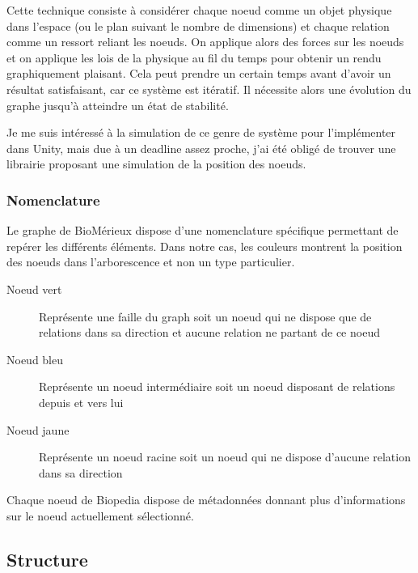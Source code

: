 Cette technique consiste à considérer chaque noeud comme un objet physique dans l'espace (ou le plan suivant le nombre de dimensions) et chaque relation comme un ressort reliant les noeuds.
On applique alors des forces sur les noeuds et on applique les lois de la physique au fil du temps pour obtenir un rendu graphiquement plaisant.
Cela peut prendre un certain temps avant d'avoir un résultat satisfaisant, car ce système est itératif.
Il nécessite alors une évolution du graphe jusqu'à atteindre un état de stabilité.

Je me suis intéressé à la simulation de ce genre de système pour l'implémenter dans Unity, mais due à un deadline assez proche, j'ai été obligé de trouver une librairie proposant une simulation de la position des noeuds.

\subsubsection{Nomenclature}
\label{biomerieuxBiopediaNomenclature}

Le graphe de BioMérieux dispose d'une nomenclature spécifique permettant de repérer les différents éléments.
Dans notre cas, les couleurs montrent la position des noeuds dans l'arborescence et non un type particulier.

\begin{description}
    \item[Noeud vert] Représente une faille du graph soit un noeud qui ne dispose que de relations dans sa direction et aucune relation ne partant de ce noeud
    \item[Noeud bleu] Représente un noeud intermédiaire soit un noeud disposant de relations depuis et vers lui
    \item[Noeud jaune] Représente un noeud racine soit un noeud qui ne dispose d'aucune relation dans sa direction
\end{description}

Chaque noeud de Biopedia dispose de métadonnées donnant plus d'informations sur le noeud actuellement sélectionné.

\subsection{Structure}
\label{biomerieuxBiopediaStructure}

